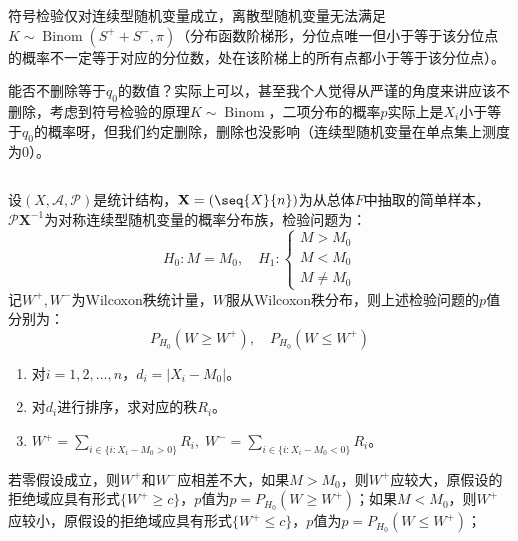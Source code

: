 \begin{note}
	符号检验仅对连续型随机变量成立，离散型随机变量无法满足$K\sim\operatorname{Binom}(S^++S^-,\pi)$（分布函数阶梯形，分位点唯一但小于等于该分位点的概率不一定等于对应的分位数，处在该阶梯上的所有点都小于等于该分位点）。\par
	能否不删除等于$q_0$的数值？实际上可以，甚至我个人觉得从严谨的角度来讲应该不删除，考虑到符号检验的原理$K\sim\operatorname{Binom}$，二项分布的概率$p$实际上是$X_i$小于等于$q_0$的概率呀，但我们约定删除，删除也没影响（连续型随机变量在单点集上测度为$0$）。
\end{note}
\inputminted[bgcolor=white, linenos, frame=single, numbersep=5pt, breaklines]{r}{statistics/testing-hypothesis/sign-test.R}

\begin{method}
	设$(X,\mathscr{A},\mathscr{P})$是统计结构，$\mathbf{X}=(\seq{X}{n})$为从总体$F$中抽取的简单样本，$\mathscr{P}\mathbf{X}^{-1}$为对称连续型随机变量的概率分布族，检验问题为：
	\begin{equation*}
		H_0:M=M_0,\quad H_1:
		\begin{cases}
			M>M_0 \\
			M<M_0 \\
			M\ne M_0
		\end{cases}
	\end{equation*}
	记$W^+,W^-$为Wilcoxon秩统计量，$W$服从Wilcoxon秩分布，则上述检验问题的$p$值分别为：
	\begin{equation*}
		P_{H_0}(W\geqslant W^+),\quad P_{H_0}(W\leqslant W^+)
	\end{equation*}
	\begin{enumerate}
		\item 对$i=1,2,\dots,n$，$d_i=|X_i-M_0|$。
		\item 对$d_i$进行排序，求对应的秩$R_i$。
		\item $W^+=\sum\limits_{i\in\{i:X_i-M_0>0\}}R_i,\;W^-=\sum\limits_{i\in\{i:X_i-M_0<0\}}R_i$。
	\end{enumerate}
\end{method}
\begin{derivation}
	若零假设成立，则$W^+$和$W^-$应相差不大，如果$M>M_0$，则$W^+$应较大，原假设的拒绝域应具有形式$\{W^+\geqslant c\}$，$p$值为$p=P_{H_0}(W\geqslant W^+)$；如果$M<M_0$，则$W^+$应较小，原假设的拒绝域应具有形式$\{W^+\leqslant c\}$，$p$值为$p=P_{H_0}(W\leqslant W^+)$；
\end{derivation}

